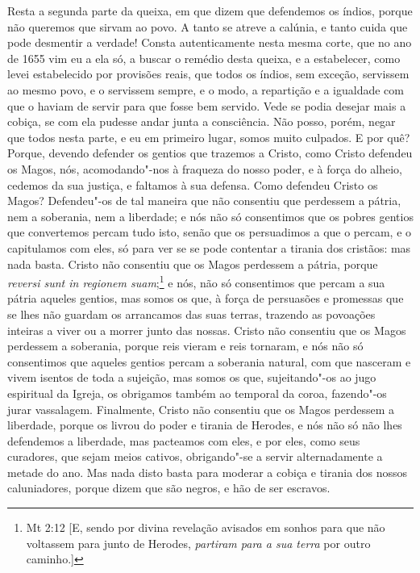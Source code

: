 Resta a segunda parte da queixa, em que dizem que defendemos os índios,
porque não queremos que sirvam ao povo. A tanto se atreve a calúnia, e
tanto cuida que pode desmentir a verdade! Consta autenticamente nesta
mesma corte, que no ano de 1655 vim eu a ela só, a buscar o remédio
desta queixa, e a estabelecer, como levei estabelecido por provisões
reais, que todos os índios, sem exceção, servissem ao mesmo povo, e o
servissem sempre, e o modo, a repartição e a igualdade com que o haviam
de servir para que fosse bem servido. Vede se podia desejar mais a
cobiça, se com ela pudesse andar junta a consciência. Não posso, porém,
negar que todos nesta parte, e eu em primeiro lugar, somos muito
culpados. E por quê? Porque, devendo defender os gentios que trazemos a
Cristo, como Cristo defendeu os Magos, nós, acomodando"-nos à fraqueza do
nosso poder, e à força do alheio, cedemos da sua justiça, e faltamos à
sua defensa. Como defendeu Cristo os Magos? Defendeu"-os de tal maneira
que não consentiu que perdessem a pátria, nem a soberania, nem a
liberdade; e nós não só consentimos que os pobres gentios que
convertemos percam tudo isto, senão que os persuadimos a que o percam, e
o capitulamos com eles, só para ver se se pode contentar a tirania dos
cristãos: mas nada basta. Cristo não consentiu que os
Magos perdessem a pátria, porque \emph{reversi sunt in regionem suam};\footnote{Mt 2:12 [E, sendo por divina revelação avisados em sonhos para que não voltassem para junto de
Herodes, \emph{partiram para a sua terra} por outro caminho.]} e nós, não só consentimos que percam a sua pátria aqueles
gentios, mas somos os que, à força de persuasões e promessas que se lhes
não guardam os arrancamos das suas terras, trazendo as povoações
inteiras a viver ou a morrer junto das nossas. Cristo não consentiu que
os Magos perdessem a soberania, porque reis vieram e reis tornaram, e
nós não só consentimos que aqueles gentios percam a soberania natural,
com que nasceram e vivem isentos de toda a sujeição, mas somos os que,
sujeitando"-os ao jugo espiritual da Igreja, os obrigamos também ao
temporal da coroa, fazendo"-os jurar vassalagem. Finalmente, Cristo não
consentiu que os Magos perdessem a liberdade, porque os livrou do poder
e tirania de Herodes, e nós não só não lhes defendemos a liberdade, mas
pacteamos com eles, e por eles, como seus curadores, que sejam meios
cativos, obrigando"-se a servir alternadamente a metade do ano. Mas nada
disto basta para moderar a cobiça e tirania dos nossos caluniadores,
porque dizem que são negros, e hão de ser escravos.

